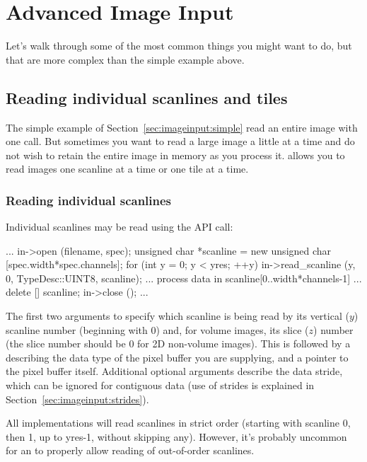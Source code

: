 \section{Advanced Image Input}
\label{sec:advancedimageinput}

Let's walk through some of the most common things you might want to do,
but that are more complex than the simple example above.


\subsection{Reading individual scanlines and tiles}
\label{sec:imageinput:scanlinestiles}

The simple example of Section~\ref{sec:imageinput:simple} read an
entire image with one call.  But sometimes you want to read a large
image a
little at a time and do not wish to retain the entire image in memory
as you process it.  \product allows you to read images
one scanline at a time or one tile at a time.

\subsubsection{Reading individual scanlines}

Individual scanlines may be read using the \readscanline API
call:

\begin{code}
        ...
        in->open (filename, spec);
        unsigned char *scanline = new unsigned char [spec.width*spec.channels];
        for (int y = 0;  y < yres;  ++y) {
            in->read_scanline (y, 0, TypeDesc::UINT8, scanline);
            ... process data in scanline[0..width*channels-1] ...
        }
        delete [] scanline;
        in->close ();
        ...
\end{code}

The first two arguments to \readscanline specify which scanline
is being read by its vertical ($y$) scanline number (beginning with 0)
and, for volume images, its slice ($z$) number (the slice number should
be 0 for 2D non-volume images).  This is followed by a \TypeDesc
describing the data type of the pixel buffer you are supplying, and a
pointer to the pixel buffer itself.  Additional optional arguments
describe the data stride, which can be ignored for contiguous data (use
of strides is explained in Section~\ref{sec:imageinput:strides}).

All \ImageInput implementations will read scanlines in strict order
(starting with scanline 0, then 1, up to {\kw yres-1}, without skipping
any).  However, it's probably uncommon for an \ImageInput to properly
allow reading of out-of-order scanlines.

